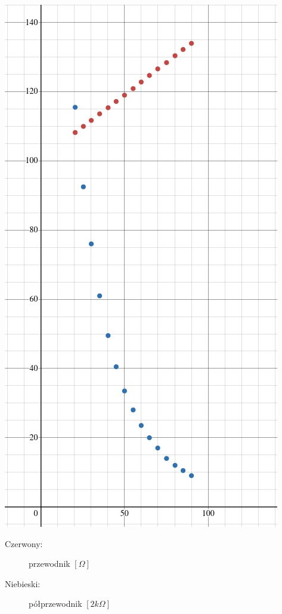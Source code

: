 \documentclass[a4paper, 11pt]{article}
\begin{document}
\begin{minipage}{0.6\textwidth}
	\includegraphics[scale=0.45]{images/wykres1.png}
\end{minipage}%
\begin{minipage}{0.5\textwidth}
	\begin{description}
		\item[Czerwony:] przewodnik $[\Omega]$
		\item[Niebieski:] półprzewodnik $[2k \Omega]$
	\end{description}
\end{minipage}
\end{document}
